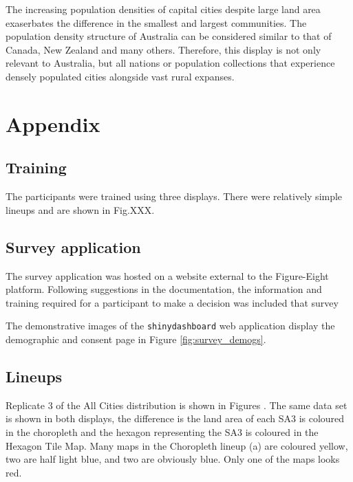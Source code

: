 \documentclass[conference,final,]{IEEEtran}
\begin{document}
The increasing population densities of capital cities despite large land area exaserbates the difference in the smallest and largest communities.
The population density structure of Australia can be considered similar to that of Canada, New Zealand and many others. Therefore, this display is not only relevant to Australia, but all nations or population collections that experience densely populated cities alongside vast rural expanses.

\hypertarget{appendix}{%
\section{Appendix}\label{appendix}}

\hypertarget{training}{%
\subsection{Training}\label{training}}

The participants were trained using three displays. There were relatively simple lineups and are shown in Fig.XXX.

\hypertarget{survey-application}{%
\subsection{Survey application}\label{survey-application}}

The survey application was hosted on a website external to the Figure-Eight platform. Following suggestions in the documentation, the information and training required for a participant to make a decision was included that survey

The demonstrative images of the \texttt{shinydashboard} web application display the demographic and consent page in Figure
\ref{fig:survey_demogs}.

\hypertarget{lineups}{%
\subsection{Lineups}\label{lineups}}

Replicate 3 of the All Cities distribution is shown in Figures . The same data set is shown in both displays, the difference is the land area of each SA3 is coloured in the choropleth and the hexagon representing the SA3 is coloured in the Hexagon Tile Map. Many maps in the Choropleth lineup (a) are coloured yellow, two are half light blue, and two are obviously blue. Only one of the maps looks red.
\end{document}
